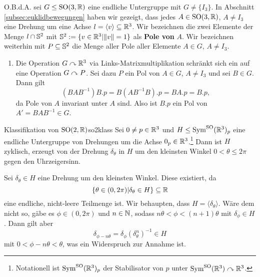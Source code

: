 \begin{beweis}
O.B.d.A. sei $G \leq \text{SO}(3,\R)$ eine endliche Untergruppe mit $G \neq \{I_3\}$. In Abschnitt \ref{subsec:euklidbewegungen} haben wir gezeigt, dass jedes $A \in \text{SO}(3,\R)$, $A \neq I_3$ eine Drehung um eine Achse $l = \langle v \rangle \sub \R^3$. Wir bezeichnen die zwei Elemente der Menge $l \cap \S^2$ mit $\S^2 := \{ v \in \R^3| \|v\| = 1\}$ als \textbf{Pole von} $A$. Wir bezeichnen weiterhin mit $P \sub \S^2$ die Menge aller Pole aller Elemente $A \in G$, $A \neq I_3$.
\begin{enumerate}
\item Die Operation $G \acts \R^3$ via Links-Matrixmultiplikation schränkt sich ein auf eine Operation $G \acts P$. Sei dazu $P$ ein Pol von $A \in G$, $A \neq I_3$ und sei $B \in G$. Dann gilt
\begin{equation}
(BAB^{-1})B.p = B(AB^{-1}B).p = BA.p = B.p,
\end{equation}
da Pole von $A$ invariant unter $A$ sind. Also ist $B.p$ ein Pol von $A' = B AB^{-1} \in G$.
\end{enumerate}
\end{beweis}
\begin{lemma}{Klassifikation von $\text{SO}(2,\R)$}{so2klass}
Sei $0 \neq p \in \R^3$ und $H \leq \Symso (\R^3)_p$ eine endliche Untergruppe von Drehungen um die Achse $0_p \in \R^3$.\footnote{Notationell ist $\Symso (\R^3)_p$ der Stabilisator von $p$ unter $\Symso (\R^3) \acts \R^3$.} Dann ist $H$ zyklisch, erzeugt von der Drehung $\delta_\theta$ in $H$ um den kleinsten Winkel $0<\theta \leq 2\pi$ gegen den Uhrzeigersinn.
\end{lemma}
\begin{beweis}
Sei $\delta_\theta \in H$ eine Drehung um den kleinsten Winkel. Diese existiert, da 
\begin{equation}
\{\theta \in (0,2\pi)|\delta_\theta \in H\} \sub \R
\end{equation}
eine endliche, nicht-leere Teilmenge ist. Wir behaupten, dass $H = \langle \delta_\theta \rangle$. Wäre dem nicht so, gäbe es $\phi \in (0,2\pi)$ und $n \in \N$, sodass $n\theta < \phi < (n+1) \theta$ mit $\delta_\phi \in H$. Dann gilt aber 
\begin{equation}
\delta_{\phi - n\theta} = \delta_\phi (\delta_\theta^n)^{-1} \in H
\end{equation}
mit $0 < \phi - n\theta < \theta$, was ein Widerspruch zur Annahme ist.
\end{beweis}
